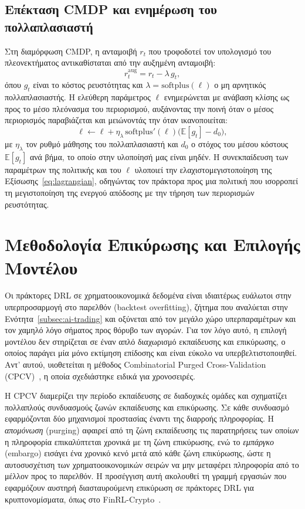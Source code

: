 \subsection{Επέκταση CMDP και ενημέρωση του πολλαπλασιαστή}

Στη διαμόρφωση CMDP, η ανταμοιβή $r_t$ που τροφοδοτεί τον υπολογισμό του
πλεονεκτήματος αντικαθίσταται από την αυξημένη ανταμοιβή:
\begin{equation}
  r^{\mathrm{aug}}_t = r_t - \lambda\, g_t,
  \label{eq:augreward}
\end{equation}
όπου $g_t$ είναι το κόστος ρευστότητας και $\lambda = \mathrm{softplus}(\ell)$
ο μη αρνητικός πολλαπλασιαστής. Η ελεύθερη παράμετρος $\ell$ ενημερώνεται με
ανάβαση κλίσης ως προς το μέσο πλεόνασμα του περιορισμού, αυξάνοντας την ποινή
όταν ο μέσος περιορισμός παραβιάζεται και μειώνοντάς την όταν ικανοποιείται:
\begin{equation}
  \ell \leftarrow \ell + \eta_\lambda\, \mathrm{softplus}'(\ell)\bigl(\mathbb{E}[g_t] - d_0\bigr),
  \label{eq:multiplierupdate}
\end{equation}
με $\eta_\lambda$ τον ρυθμό μάθησης του πολλαπλασιαστή και $d_0$ ο στόχος του 
μέσου κόστους $\mathbb{E}[g_t]$ ανά βήμα, το οποίο στην υλοποίησή μας είναι μηδέν. 
Η συνεκπαίδευση των παραμέτρων της πολιτικής και του $\ell$ υλοποιεί την 
ελαχιστομεγιστοποίηση της Εξίσωσης~\eqref{eq:lagrangian}, οδηγώντας τον 
πράκτορα προς μια πολιτική που ισορροπεί τη μεγιστοποίηση της ενεργού 
απόδοσης με την τήρηση των περιορισμών ρευστότητας.


\section{Μεθοδολογία Επικύρωσης και Επιλογής Μοντέλου}
\label{sec:validation}

Οι πράκτορες DRL σε χρηματοοικονομικά δεδομένα είναι ιδιαιτέρως ευάλωτοι στην
υπερπροσαρμογή στο παρελθόν (backtest overfitting), ζήτημα που αναλύεται στην
Ενότητα~\ref{subsec:ai-trading} και οξύνεται από τον μεγάλο χώρο υπερπαραμέτρων και τον χαμηλό
λόγο σήματος προς θόρυβο των αγορών. Για τον λόγο αυτό, η επιλογή μοντέλου δεν
στηρίζεται σε έναν απλό διαχωρισμό εκπαίδευσης και επικύρωσης, ο οποίος παράγει
μία μόνο εκτίμηση επίδοσης και είναι εύκολο να υπερβελτιστοποιηθεί. Αντ' αυτού,
υιοθετείται η μέθοδος Combinatorial Purged Cross-Validation
(CPCV)~\cite{lopezdeprado2018}, η οποία σχεδιάστηκε ειδικά για χρονοσειρές.

Η CPCV διαμερίζει την περίοδο εκπαίδευσης σε διαδοχικές ομάδες και σχηματίζει
πολλαπλούς συνδυασμούς ζωνών εκπαίδευσης και επικύρωσης. Σε κάθε συνδυασμό
εφαρμόζονται δύο μηχανισμοί προστασίας έναντι της διαρροής πληροφορίας. Η
\emph{απομόνωση} (purging) αφαιρεί από τη ζώνη εκπαίδευσης τις παρατηρήσεις
των οποίων η πληροφορία επικαλύπτεται χρονικά με τη ζώνη επικύρωσης, ενώ το
\emph{εμπάργκο} (embargo) εισάγει ένα χρονικό κενό μετά από κάθε ζώνη
επικύρωσης, ώστε η αυτοσυσχέτιση των χρηματοοικονομικών σειρών να μην μεταφέρει
πληροφορία από το μέλλον προς το παρελθόν. Η προσέγγιση αυτή ακολουθεί τη
γραμμή εργασιών που εφαρμόζουν αυστηρή διασταυρούμενη επικύρωση σε πράκτορες
DRL για κρυπτονομίσματα, όπως στο FinRL-Crypto~\cite{gort2022finrlcrypto}.

